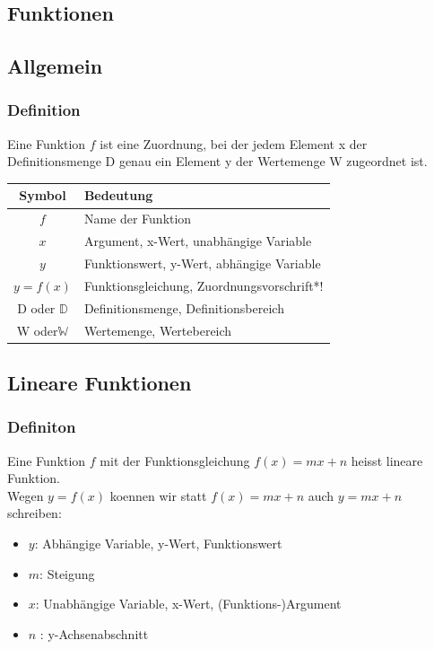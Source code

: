 \begin{multicols}{2}
    \newpage


    \section{Funktionen}
    \vspace{-4mm}
    \subsection{Allgemein}
    \vspace{-4mm}
    \subsubsection{Definition}
    \vspace{-4mm}
    Eine Funktion $f$ ist eine Zuordnung, bei der jedem Element x der Definitionsmenge D genau ein Element y der Wertemenge W zugeordnet ist.

    \begin{tabularx}{0.5\textwidth} {
            | >{\raggedright\arraybackslash}c
            | >{\raggedright\arraybackslash}X |}
        \hline
        \textbf{Symbol}     & \textbf{Bedeutung}                         \\ \hline
        $f$                 & Name der Funktion                          \\ \hline
        $x$                 & Argument, x-Wert, unabhängige Variable     \\  \hline
        $y$                 & Funktionswert, y-Wert, abhängige Variable  \\  \hline
        $y = f(x)$          & Funktionsgleichung, Zuordnungsvorschrift*! \\ \hline
        D oder $\mathbb{D}$ & Definitionsmenge, Definitionsbereich       \\  \hline
        W oder$\mathbb{W}$  & Wertemenge, Wertebereich                   \\  \hline
    \end{tabularx}
    \subsection{Lineare Funktionen}
    \vspace{-4mm}
    \subsubsection{Definiton}
    \vspace{-4mm}
    Eine Funktion $f$ mit der Funktionsgleichung $f(x) = mx + n$ heisst lineare Funktion. \\
    Wegen $y = f(x)$ koennen wir statt $f(x) = mx + n$ auch $y = mx + n$ schreiben:
    \begin{itemize}
        \item $y$: Abhängige Variable, y-Wert, Funktionswert
        \item $m$: Steigung
        \item  $x$: Unabhängige Variable, x-Wert, (Funktions-)Argument
        \item $n$ : y-Achsenabschnitt
    \end{itemize}

\end{multicols}
